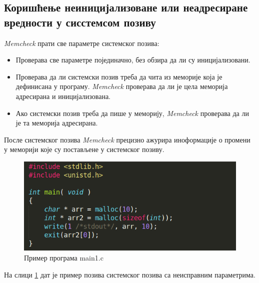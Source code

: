 \documentclass[12pt,oneside]{memoir}
\begin{document}
\subsection{Коришћење неиницијализоване или неадресиране вредности у сисстемсом позиву}

\indent \textit{Memcheck} прати све параметре системског позива:
 
\begin{itemize}
  \item Проверава све параметре појединачно, без обзира да ли су иницијализовани.
  \item Проверава да ли системски позив треба да чита из меморије која је дефинисана у програму. \textit{Memcheck} проверава да ли је цела меморија адресирана и иницијализована.
  \item Ако системски позив треба да пише у меморију, \textit{Memcheck} проверава да ли је та меморија адресирана.
\end{itemize}

\indent После системског позива \textit{Memcheck} прецизно ажурира иноформације о промени у меморији које су постављене у системског позиву.

\begin{figure}[h!]
\begin{center}
\includegraphics[scale=0.75]{slika3.png}
\end{center}
\caption{Пример програма main1.c}
\label{fig:main1}
\end{figure}

\indent На слици \ref{fig:main1} дат је пример позива системског позива са неисправним параметрима.
\end{document}
